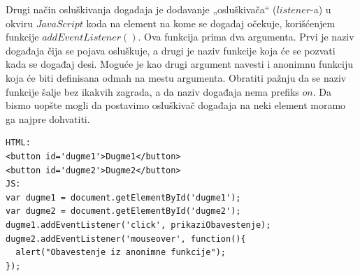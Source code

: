 \documentclass[a4paper]{article}
\begin{document}
Drugi način osluškivanja događaja je dodavanje „osluškivača“ ($listener$-a) u okviru
$JavaScript$ koda na element na kome se događaj očekuje, korišćenjem funkcije
$addEventListener()$. Ova funkcija prima dva argumenta. Prvi je naziv događaja čija se
pojava osluškuje, a drugi je naziv funkcije koja će se pozvati kada se događaj desi. Moguće je kao drugi argument navesti i anonimnu funkciju koja će biti definisana odmah na mestu argumenta. Obratiti pažnju da se naziv funkcije šalje bez ikakvih zagrada, a da naziv događaja nema prefiks $on$. Da bismo uopšte mogli da postavimo osluškivač događaja na neki element moramo ga najpre dohvatiti.
\begin{lstlisting}[backgroundcolor = \color{lightgray}]
HTML:
<button id='dugme1'>Dugme1</button>
<button id='dugme2'>Dugme2</button>
JS:
var dugme1 = document.getElementById('dugme1');
var dugme2 = document.getElementById('dugme2');
dugme1.addEventListener('click', prikaziObavestenje);
dugme2.addEventListener('mouseover', function(){
  alert("Obavestenje iz anonimne funkcije");
});
\end{lstlisting}
\end{document}

